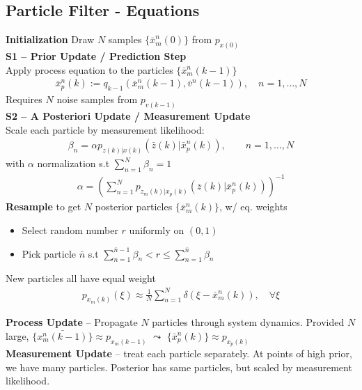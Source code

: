 \subsection{Particle Filter - Equations}
\vspace{0.2em}
\textbf{Initialization} Draw $N$ samples $\{ \bar{x}_m^n(0) \}$
from $p_{x(0)}$ \\
\textbf{S1 -- Prior Update / Prediction Step}\\
Apply process equation to the particles $\{ \bar{x}_m^n(k-1) \}$
\begin{align*}
    \bar{x}_p^n(k) := q_{k-1}(\bar{x}_m^n(k-1), \bar{v}^n(k-1)), 
    \quad n=1,\dots,N
\end{align*}
Requires $N$ noise samples from $p_{v(k-1)}$\\
\textbf{S2 -- A Posteriori Update / Measurement Update}\\
Scale each particle by measurement likelihood:
\begin{align*}
    \beta_n = \alpha p_{z(k)|x(k)}(\bar{z}(k)|\bar{x}_p^n(k)),
    \qquad n=1,\dots,N
\end{align*}
with $\alpha$ normalization s.t $\sum_{n=1}^N \beta_n = 1$
\begin{align*}
    \alpha = \left( \textstyle\sum_{n=1}^{N} p_{z_m(k)|x_p(k)}(\bar{z}(k) | \bar{x}_p^n(k)) \right)^{-1}
\end{align*}
\textbf{Resample} to get $N$ posterior particles
$\{ \bar{x}_m^n(k) \}$, w/ eq. weights

\begin{tcolorbox}[title= Repeat $N$ times: , sharp corners, coltitle=black, colbacktitle=black!20, colback=white!30, colframe=black, boxsep=1pt, left=1pt, right=1pt, top=1pt, bottom=1pt, title filled, boxrule=0.2mm]
    \begin{itemize}[leftmargin=1em, noitemsep]
        \item Select random number $r$ uniformly on $(0,1)$
        \item Pick particle $\bar{n}$ s.t $\sum_{n=1}^{\bar{n}-1}\beta_n < r \leq \sum_{n=1}^{\bar{n}}\beta_n$
    \end{itemize}
\end{tcolorbox}
New particles all have equal weight
\begin{align*}
    p_{x_m(k)}(\xi) \approx \textstyle\frac{1}{N}\sum_{n=1}^{N}\delta(\xi - \bar{x}_m^n(k)), \quad \forall\xi
\end{align*}


\textbf{Process Update} -- Propagate $N$ particles through system dynamics. 
Provided $N$ large, $\{ \bar{x_m^n(k-1)} \} \approx p_{x_m(k-1)}$ $\leadsto$ $\{\bar{x}_p^n(k)\} \approx p_{x_p(k)}$\\
\textbf{Measurement Update} -- treat each particle separately. 
At points of high prior, we have many particles. 
Posterior has same particles, but scaled by measurement likelihood.
\vspace{0.2em}
